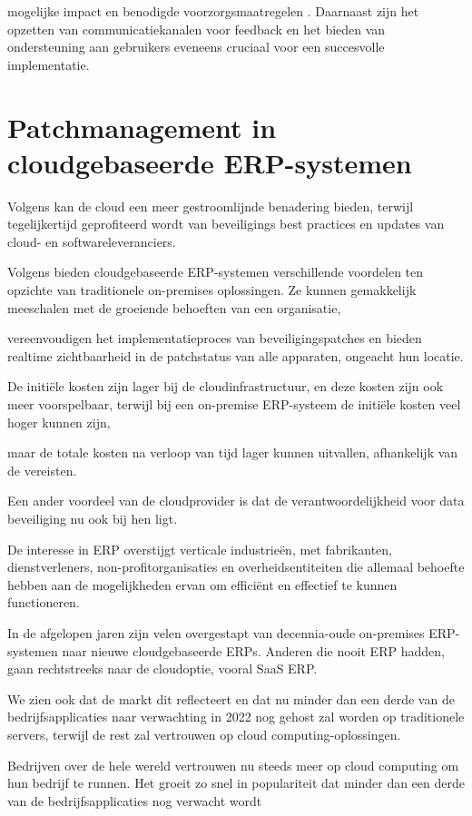 mogelijke impact en benodigde voorzorgsmaatregelen \autocite{Toren2019}. Daarnaast zijn het opzetten van communicatiekanalen voor feedback en het bieden van ondersteuning aan gebruikers eveneens cruciaal voor een succesvolle implementatie.


\section{Patchmanagement in cloudgebaseerde ERP-systemen}
Volgens \textcite{Forbes2021} kan de cloud een meer gestroomlijnde benadering bieden, terwijl tegelijkertijd geprofiteerd wordt van beveiligings best practices en updates van cloud- en softwareleveranciers. 

Volgens \textcite{Ruiter2024} bieden cloudgebaseerde ERP-systemen verschillende voordelen ten opzichte van traditionele on-premises oplossingen. Ze kunnen gemakkelijk meeschalen met de groeiende behoeften van een organisatie, 

vereenvoudigen het implementatieproces van beveiligingspatches en bieden realtime zichtbaarheid in de patchstatus van alle apparaten, ongeacht hun locatie.

De initiële kosten zijn lager bij de cloudinfrastructuur, en deze kosten zijn ook meer voorspelbaar, terwijl bij een on-premise ERP-systeem de initiële kosten veel hoger kunnen zijn, 

maar de totale kosten na verloop van tijd lager kunnen uitvallen, afhankelijk van de vereisten. 

Een ander voordeel van de cloudprovider is dat de verantwoordelijkheid voor data beveiliging nu ook bij hen ligt.

De interesse in ERP overstijgt verticale industrieën, met fabrikanten, dienstverleners, non-profitorganisaties en overheidsentiteiten die allemaal behoefte hebben aan de mogelijkheden ervan om efficiënt en effectief te kunnen functioneren.

In de afgelopen jaren zijn velen overgestapt van decennia-oude on-premises ERP-systemen naar nieuwe cloudgebaseerde ERPs. Anderen die nooit ERP hadden, gaan rechtstreeks naar de cloudoptie, vooral SaaS ERP.

We zien ook dat de markt dit reflecteert en dat nu minder dan een derde van de bedrijfsapplicaties naar verwachting in 2022 nog gehost zal worden op traditionele servers, terwijl de rest zal vertrouwen op cloud computing-oplossingen.

Bedrijven over de hele wereld vertrouwen nu steeds meer op cloud computing om hun bedrijf te runnen. Het groeit zo snel in populariteit dat minder dan een derde van de bedrijfsapplicaties nog verwacht wordt 

